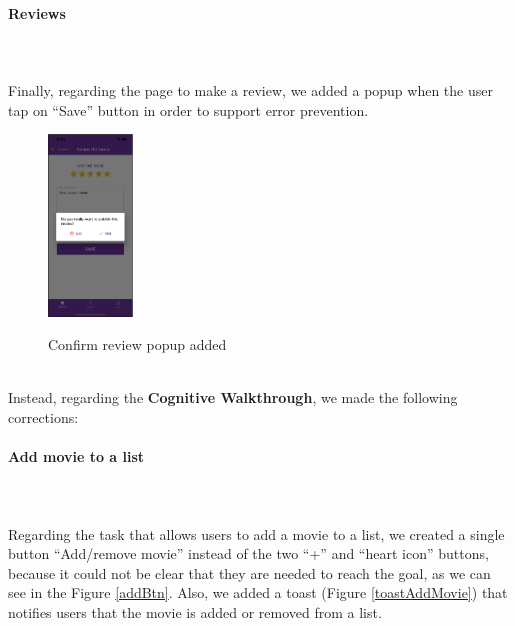 \documentclass[12pt, a4paper]{article}
\numberwithin{figure}{section}
\begin{document}
\paragraph{Reviews}\mbox{}\\\\
Finally, regarding the page to make a review, we added a popup when the user tap on “Save” button in 
order to support error prevention. 
\begin{figure}[H]
	\centering
	\includegraphics[width=0.2\textwidth]{images/prototype1/confirmReview.png}\\
	\caption{Confirm review popup added}
\end{figure}

\mbox{}\\
\noindent %
Instead, regarding the \textbf{Cognitive Walkthrough}, we made the following corrections:
\paragraph{Add movie to a list}
\mbox{}\\\\
Regarding the task that allows users to add a movie to a list, we created a single button “Add/remove movie”
instead of the two “+” and “heart icon” buttons, because it could not be clear that they are needed to reach the goal,
as we can see in the Figure \ref{addBtn}.
Also, we added a toast (Figure \ref{toastAddMovie}) that notifies users that the movie is added or removed from a list.
\end{document}
